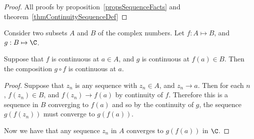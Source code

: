 \documentclass[../Main.tex]{subfiles}
\begin{document}
\begin{proof}
    All proofs by proposition~\ref{propsSequenceFacts} and theorem~\ref{thmContinuitySequenceDef}
\end{proof}
\begin{theorem}
    Consider two subsets $A$ and $B$ of the complex numbers. Let $f : A \mapsto B$, and $g : B \mapsto \C$.\par
    Suppose that $f$ is continuous at $a \in A$, and $g$ is continuous at $f(a) \in B$. Then the composition $g \circ f$ is continuous at $a$.
    \label{thmCompositionContinuous}
\end{theorem}
\begin{proof}
    Suppose that $z_n$ is any sequence with $z_n \in A$, and $z_n \to a$. Then for each $n$, $f(z_n) \in B$, and $f(z_n) \to f(a)$ by continuity of $f$. Therefore this is a sequence in $B$ converging to $f(a)$ and so by the continuity of $g$, the sequence $g(f(z_n))$ must converge to $g(f(a))$.\par
    Now we have that any sequence $z_n$ in $A$ converges to $g(f(a))$ in $\C$.
\end{proof}
\end{document}
